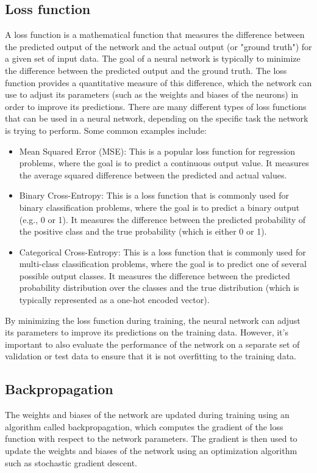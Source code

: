 \documentclass[a4paper]{sapthesis}
\begin{document}
\subsection{Loss function} \label{sec:loss}
A loss function is a mathematical function that measures the difference 
between the predicted output of the network and the actual output (or 
"ground truth") for a given set of input data.\newline 
The goal of a neural network is typically to minimize the difference 
between the predicted output and the ground truth. The loss function 
provides a quantitative measure of this difference, which the network 
can use to adjust its parameters (such as the weights and biases of the 
neurons) in order to improve its predictions.\newline 
There are many different types of loss functions that can be used in a 
neural network, depending on the specific task the network is trying to 
perform. Some common examples include:
\begin{itemize}
\item{Mean Squared Error (MSE)}: This is a popular loss function for regression 
problems, where the goal is to predict a continuous output value. It 
measures the average squared difference between the predicted and actual 
values.
\item{Binary Cross-Entropy}: This is a loss function that is commonly used for 
binary classification problems, where the goal is to predict a binary 
output (e.g., 0 or 1). It measures the difference between the predicted 
probability of the positive class and the true probability (which is 
either 0 or 1).
\item{Categorical Cross-Entropy}: This is a loss function that is commonly used 
for multi-class classification problems, where the goal is to predict one 
of several possible output classes. It measures the difference between the 
predicted probability distribution over the classes and the true 
distribution (which is typically represented as a one-hot encoded vector).
\end{itemize}
By minimizing the loss function during training, the neural network 
can adjust its parameters to improve its predictions on the training 
data. However, it's important to also evaluate the performance of the 
network on a separate set of validation or test data to ensure that 
it is not overfitting to the training data.
\subsection{Backpropagation}\label{sec:backpropagation}
 The weights and biases of the network are updated during 
training using an algorithm called backpropagation, which computes the 
gradient of the loss function with respect to the network parameters.
 The gradient is then used to update the weights and biases of the network
  using an optimization algorithm such as stochastic gradient descent.
\end{document}
